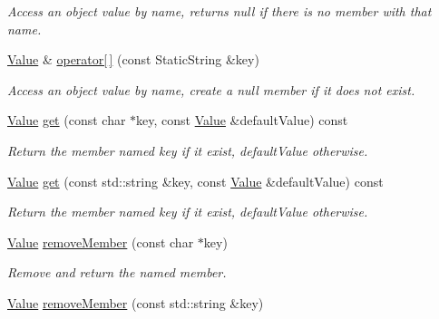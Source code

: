 \begin{DoxyCompactItemize}
\begin{DoxyCompactList}\small\item\em Access an object value by name, returns null if there is no member with that name. \end{DoxyCompactList}\item 
\hyperlink{protocol_json_1_1_j_s_o_n___a_p_i_a3a85c4423131080eb9300546d6130dfd}{Value} \& \hyperlink{protocol_json_1_1_j_s_o_n___a_p_i_a8e5d70129219a62c3d54e0a230c74523}{operator\mbox{[}$\,$\mbox{]}} (const Static\-String \&key)
\begin{DoxyCompactList}\small\item\em Access an object value by name, create a null member if it does not exist. \end{DoxyCompactList}\item 
\hypertarget{protocol_json_1_1_j_s_o_n___a_p_i_a883d6ce140e5bd2dac32f0321b2f0b96}{\hyperlink{protocol_json_1_1_j_s_o_n___a_p_i_a3a85c4423131080eb9300546d6130dfd}{Value} \hyperlink{protocol_json_1_1_j_s_o_n___a_p_i_a883d6ce140e5bd2dac32f0321b2f0b96}{get} (const char $\ast$key, const \hyperlink{protocol_json_1_1_j_s_o_n___a_p_i_a3a85c4423131080eb9300546d6130dfd}{Value} \&default\-Value) const }\label{protocol_json_1_1_j_s_o_n___a_p_i_a883d6ce140e5bd2dac32f0321b2f0b96}

\begin{DoxyCompactList}\small\item\em Return the member named key if it exist, default\-Value otherwise. \end{DoxyCompactList}\item 
\hypertarget{protocol_json_1_1_j_s_o_n___a_p_i_aa21732e6c5e1eced8a7eaafa00502521}{\hyperlink{protocol_json_1_1_j_s_o_n___a_p_i_a3a85c4423131080eb9300546d6130dfd}{Value} \hyperlink{protocol_json_1_1_j_s_o_n___a_p_i_aa21732e6c5e1eced8a7eaafa00502521}{get} (const std\-::string \&key, const \hyperlink{protocol_json_1_1_j_s_o_n___a_p_i_a3a85c4423131080eb9300546d6130dfd}{Value} \&default\-Value) const }\label{protocol_json_1_1_j_s_o_n___a_p_i_aa21732e6c5e1eced8a7eaafa00502521}

\begin{DoxyCompactList}\small\item\em Return the member named key if it exist, default\-Value otherwise. \end{DoxyCompactList}\item 
\hyperlink{protocol_json_1_1_j_s_o_n___a_p_i_a3a85c4423131080eb9300546d6130dfd}{Value} \hyperlink{protocol_json_1_1_j_s_o_n___a_p_i_adfff71c85ae69604406249612234959c}{remove\-Member} (const char $\ast$key)
\begin{DoxyCompactList}\small\item\em Remove and return the named member. \end{DoxyCompactList}\item 
\hypertarget{protocol_json_1_1_j_s_o_n___a_p_i_a9a8efed29e3f58cf60a12a519ab389e3}{\hyperlink{protocol_json_1_1_j_s_o_n___a_p_i_a3a85c4423131080eb9300546d6130dfd}{Value} \hyperlink{protocol_json_1_1_j_s_o_n___a_p_i_a9a8efed29e3f58cf60a12a519ab389e3}{remove\-Member} (const std\-::string \&key)}\label{protocol_json_1_1_j_s_o_n___a_p_i_a9a8efed29e3f58cf60a12a519ab389e3}


\end{DoxyCompactItemize}
